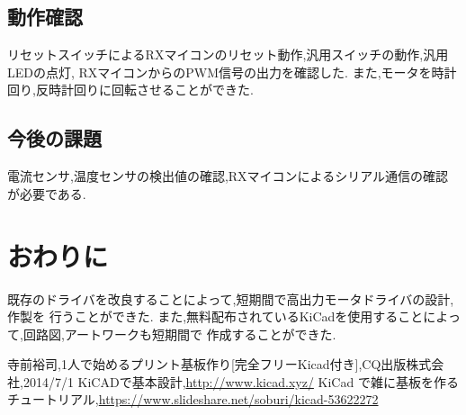 \documentclass[twocolumn,11pt]{abst}
\begin{document}
\subsection{動作確認}
リセットスイッチによるRXマイコンのリセット動作,汎用スイッチの動作,汎用LEDの点灯,
RXマイコンからのPWM信号の出力を確認した.
また,モータを時計回り,反時計回りに回転させることができた.

\subsection{今後の課題}
電流センサ,温度センサの検出値の確認,RXマイコンによるシリアル通信の確認が必要である.


\section{おわりに}
既存のドライバを改良することによって,短期間で高出力モータドライバの設計,作製を
行うことができた.
また,無料配布されているKiCadを使用することによって,回路図,アートワークも短期間で
作成することができた.

\begin{thebibliography}{8}
寺前裕司,1人で始めるプリント基板作り[完全フリーKicad付き],CQ出版株式会社,2014/7/1
 KiCADで基本設計,\url{http://www.kicad.xyz/}
 KiCad で雑に基板を作る チュートリアル,\url{https://www.slideshare.net/soburi/kicad-53622272}
\end{thebibliography}
\end{document}
